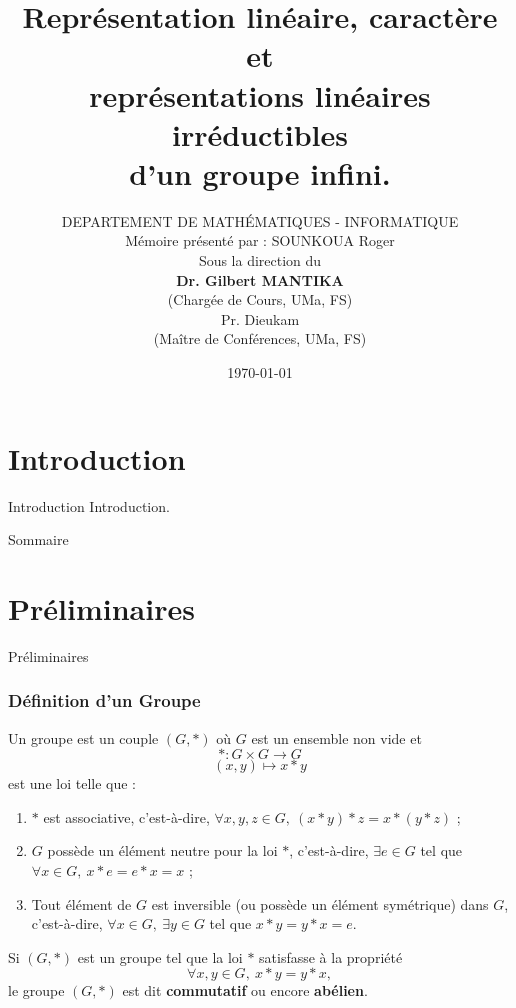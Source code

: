 \documentclass[9pt]{beamer}
\title{Représentation linéaire, caractère et \\ 
	représentations linéaires irréductibles \\ 
	d’un groupe infini.}
\author[SOUNKOUA Roger]{DEPARTEMENT DE MATHÉMATIQUES - INFORMATIQUE \\
	 Mémoire présenté par : SOUNKOUA Roger \\
Sous la direction du \\
\textbf{Dr. Gilbert MANTIKA}\\
(Chargée de Cours, UMa, FS)\\
Pr. Dieukam \\
(Maître de Conférences, UMa, FS)
}
\date{\today}
\begin{document}
	
	
	
	
	\begin{frame}
		\titlepage
	\end{frame}
	

	
	\section*{Introduction}
	\begin{frame}{Introduction}
Introduction.
	\end{frame}
	

\begin{frame}{Sommaire}
	\tableofcontents
\end{frame}
	
	
	\section{Préliminaires}
	
		\begin{frame}{Préliminaires}
		  \frametitle{Définition d'un Groupe}
		
		\begin{definition} 
Un groupe est un couple  $(G, *)$ où $G$ est un ensemble non vide et  
			\[
			* : G \times G \longrightarrow G
			\]
			\[
			(x, y) \longmapsto x * y
			\]
est une loi telle que :
			\begin{enumerate} [label=\roman*)]
				\item $*$ est associative, c'est-à-dire, $\forall x, y, z \in G, \ (x * y) * z = x * (y * z)$ ;
				\item $G$ possède un élément neutre pour la loi $*$, c'est-à-dire, $\exists e \in G$ tel que $\forall x \in G, \ x * e = e * x = x$ ;
				\item Tout élément de $G$ est inversible (ou possède un élément symétrique) dans $G$, c'est-à-dire, $\forall x \in G, \ \exists y \in G$ tel que $x * y = y * x = e$.
			\end{enumerate}
		\end{definition}
		
		\begin{definition} 
			Si \((G, \ast)\) est un groupe tel que la loi \(\ast\) satisfasse à la propriété
			\[
			\forall x, y \in G, \ x \ast y = y \ast x,
			\]
			le groupe \((G, \ast)\) est dit \textbf{commutatif} ou encore \textbf{abélien}.
		\end{definition}
		
			
	\end{frame}
	
\end{document}
